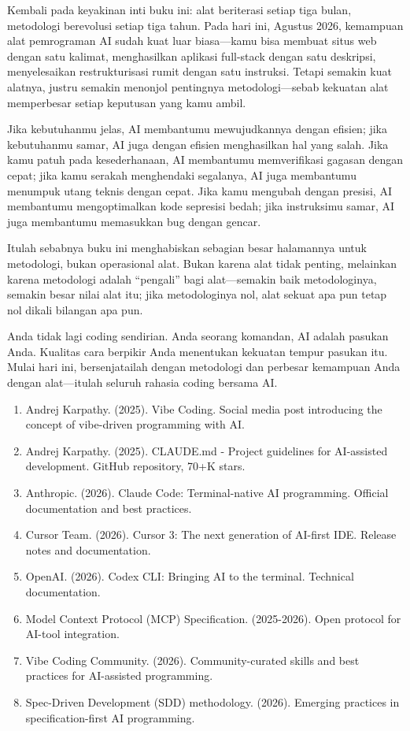 
Kembali pada keyakinan inti buku ini: alat beriterasi setiap tiga bulan, metodologi berevolusi setiap tiga tahun. Pada hari ini, Agustus 2026, kemampuan alat pemrograman AI sudah kuat luar biasa—kamu bisa membuat situs web dengan satu kalimat, menghasilkan aplikasi full-stack dengan satu deskripsi, menyelesaikan restrukturisasi rumit dengan satu instruksi. Tetapi semakin kuat alatnya, justru semakin menonjol pentingnya metodologi—sebab kekuatan alat memperbesar setiap keputusan yang kamu ambil.

Jika kebutuhanmu jelas, AI membantumu mewujudkannya dengan efisien; jika kebutuhanmu samar, AI juga dengan efisien menghasilkan hal yang salah. Jika kamu patuh pada kesederhanaan, AI membantumu memverifikasi gagasan dengan cepat; jika kamu serakah menghendaki segalanya, AI juga membantumu menumpuk utang teknis dengan cepat. Jika kamu mengubah dengan presisi, AI membantumu mengoptimalkan kode sepresisi bedah; jika instruksimu samar, AI juga membantumu memasukkan bug dengan gencar.

Itulah sebabnya buku ini menghabiskan sebagian besar halamannya untuk metodologi, bukan operasional alat. Bukan karena alat tidak penting, melainkan karena metodologi adalah “pengali” bagi alat—semakin baik metodologinya, semakin besar nilai alat itu; jika metodologinya nol, alat sekuat apa pun tetap nol dikali bilangan apa pun.

Anda tidak lagi coding sendirian. Anda seorang komandan, AI adalah pasukan Anda. Kualitas cara berpikir Anda menentukan kekuatan tempur pasukan itu. Mulai hari ini, bersenjatailah dengan metodologi dan perbesar kemampuan Anda dengan alat—itulah seluruh rahasia coding bersama AI.


\begin{enumerate}
  \item Andrej Karpathy. (2025). Vibe Coding. Social media post introducing the concept of vibe-driven programming with AI.
  \item Andrej Karpathy. (2025). CLAUDE.md - Project guidelines for AI-assisted development. GitHub repository, 70+K stars.
  \item Anthropic. (2026). Claude Code: Terminal-native AI programming. Official documentation and best practices.
  \item Cursor Team. (2026). Cursor 3: The next generation of AI-first IDE. Release notes and documentation.
  \item OpenAI. (2026). Codex CLI: Bringing AI to the terminal. Technical documentation.
  \item Model Context Protocol (MCP) Specification. (2025-2026). Open protocol for AI-tool integration.
  \item Vibe Coding Community. (2026). Community-curated skills and best practices for AI-assisted programming.
  \item Spec-Driven Development (SDD) methodology. (2026). Emerging practices in specification-first AI programming.
\end{enumerate}
